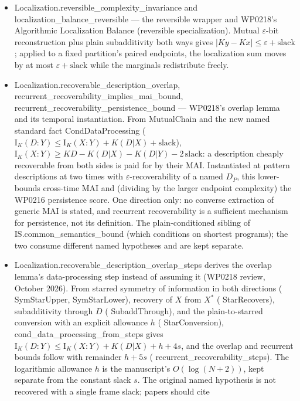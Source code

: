 \documentclass[11pt,a4paper]{article}
\newcommand{\lean}[1]{{\ttfamily\small
  \let\leanunderscore\_\def\_{\leanunderscore\allowbreak}#1}}
\newcommand{\Ik}{\mathrm{I}_K}
\begin{document}
\begin{itemize}[leftmargin=1.4em,itemsep=1pt]
invariant; \lean{localization\_mutual\_eq\_IK} ties the abstract mutual coordinate to the
frame's \lean{IK} definitionally.
\item \lean{Localization.reversible\_complexity\_invariance} and
\lean{localization\_balance\_reversible} --- the reversible wrapper and WP0218's
Algorithmic Localization Balance (reversible specialization). Mutual $\varepsilon$-bit
reconstruction plus plain subadditivity both ways gives $|K y-K x|\le\varepsilon+
\mathrm{slack}$; applied to a fixed partition's paired endpoints, the localization sum
moves by at most $\varepsilon+\mathrm{slack}$ while the marginals redistribute freely.
\item \lean{Localization.recoverable\_description\_overlap},
\lean{recurrent\_recoverability\_implies\_mai\_bound},
\lean{recurrent\_recoverability\_persistence\_bound} --- WP0218's overlap lemma and its
temporal instantiation. From \lean{MutualChain} and the new named standard fact
\lean{CondDataProcessing} ($\Ik(D{:}Y)\le\Ik(X{:}Y)+K(D|X)+\mathrm{slack}$),
$\Ik(X{:}Y)\ge K D-K(D|X)-K(D|Y)-2\,\mathrm{slack}$: a description cheaply recoverable
from both sides is paid for by their MAI. Instantiated at pattern descriptions at two
times with $\varepsilon$-recoverability of a named $D_P$, this lower-bounds cross-time
MAI and (dividing by the larger endpoint complexity) the WP0216 persistence score. One
direction only: no converse extraction of generic MAI is stated, and recurrent
recoverability is a sufficient mechanism for persistence, not its definition. The
plain-conditioned sibling of \lean{IS.common\_semantics\_bound} (which conditions on
shortest programs); the two consume different named hypotheses and are kept separate.
\item \lean{Localization.recoverable\_description\_overlap\_steps} derives the overlap lemma's
data-processing step instead of assuming it (WP0218 review, October 2026). From starred symmetry
of information in both directions (\lean{SymStarUpper}, \lean{SymStarLower}), recovery of $X$
from $X^*$ (\lean{StarRecovers}), subadditivity through $D$ (\lean{SubaddThrough}), and the
plain-to-starred conversion with an explicit allowance $h$ (\lean{StarConversion}),
\lean{cond\_data\_processing\_from\_steps} gives $\Ik(D{:}Y)\le\Ik(X{:}Y)+K(D|X)+h+4s$, and
the overlap and recurrent bounds follow with remainder $h+5s$
(\lean{recurrent\_recoverability\_steps}). The logarithmic allowance $h$
is the manuscript's $O(\log(N+2))$, kept separate from the constant slack $s$.
The original named hypothesis is not recovered with a single frame slack; papers should cite

\end{itemize}
\end{document}
